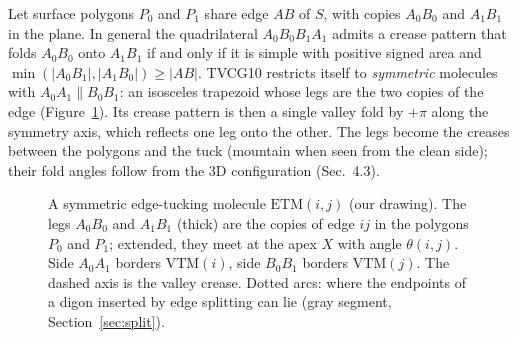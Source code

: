 \documentclass[11pt]{article}
\theoremstyle{definition}
\newcommand{\ETM}{\mathrm{ETM}}
\newcommand{\VTM}{\mathrm{VTM}}
\begin{document}
Let surface polygons $P_0$ and $P_1$ share edge $AB$ of $S$, with copies
$A_0B_0$ and $A_1B_1$ in the plane. In general the quadrilateral
$A_0B_0B_1A_1$ admits a crease pattern that folds $A_0B_0$ onto $A_1B_1$ if and
only if it is simple with positive signed area and
$\min(|A_0B_1|, |A_1B_0|) \ge |AB|$. TVCG10 restricts itself to
\emph{symmetric} molecules with $A_0A_1 \parallel B_0B_1$: an isosceles
trapezoid whose legs are the two copies of the edge (Figure~\ref{fig:etm}). Its
crease pattern is then a single valley fold by $+\pi$ along the symmetry axis,
which reflects one leg onto the other. The legs become the creases between the
polygons and the tuck (mountain when seen from the clean side); their fold
angles follow from the 3D configuration (Sec.~4.3).

\begin{figure}[ht]
\centering
{}
\caption{A symmetric edge-tucking molecule $\ETM(i,j)$ (our drawing). The legs
$A_0B_0$ and $A_1B_1$ (thick) are the copies of edge $ij$ in the polygons $P_0$
and $P_1$; extended, they meet at the apex $X$ with angle $\theta(i,j)$. Side
$A_0A_1$ borders $\VTM(i)$, side $B_0B_1$ borders $\VTM(j)$. The dashed axis is
the valley crease. Dotted arcs: where the endpoints of a digon inserted by edge
splitting can lie (gray segment, Section~\ref{sec:split}).}
\label{fig:etm}
\end{figure}
\end{document}
